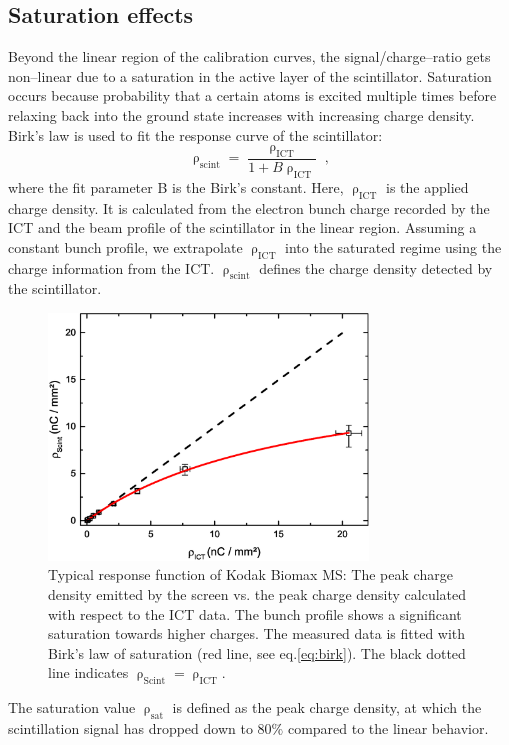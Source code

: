 \documentclass[%
reprint,
amsmath,
amssymb,
aip,
rsi, 
numerical,
floatfix,
]{revtex4-1}
\begin{document}
\subsection{\label{Se}Saturation effects}
Beyond the linear region of the calibration curves, the signal/charge--ratio gets non--linear due to a saturation in the active layer of the scintillator.
Saturation occurs because probability that a certain atoms is excited multiple times before relaxing back into the ground state increases with increasing charge density.
Birk’s law is used to fit the response curve of the scintillator:
\begin{equation}
\uprho_{\text{scint}} = \frac{\uprho_{\text{ICT}}}{1+B\uprho_{\text{ICT}}}{\;,}
\label{eq:birk}
\end{equation}
where the fit parameter B is the Birk's constant.
Here, $\uprho_{\text{ICT}}$ is the applied charge density.
It is calculated from the electron bunch charge recorded by the ICT and the beam profile of the scintillator in the linear region. 
Assuming a constant bunch profile, we extrapolate $\uprho_{\text{ICT}}$ into the saturated regime using the charge information from the ICT. $\uprho_{\text{scint}}$ defines the charge density detected by the scintillator.
\begin{figure}
\includegraphics[width=8.5cm]{./Figures/Sat_V2}%
\caption{\label{fig:Sat} Typical response function of Kodak Biomax MS: The peak charge density emitted by the screen vs. the peak charge density calculated with respect to the ICT data. 
The bunch profile shows a significant saturation towards higher charges. 
The measured data is fitted with Birk's law of saturation (red line, see eq.\ref{eq:birk}). 
The black dotted line indicates $\uprho_{\text{Scint}} = \uprho_{\text{ICT}}$.}
\end{figure}
The saturation value $\uprho_{\text{sat}}$ is defined as the peak charge density, at which the scintillation signal has dropped down to 80$\%$ compared to the linear behavior.
\end{document}
